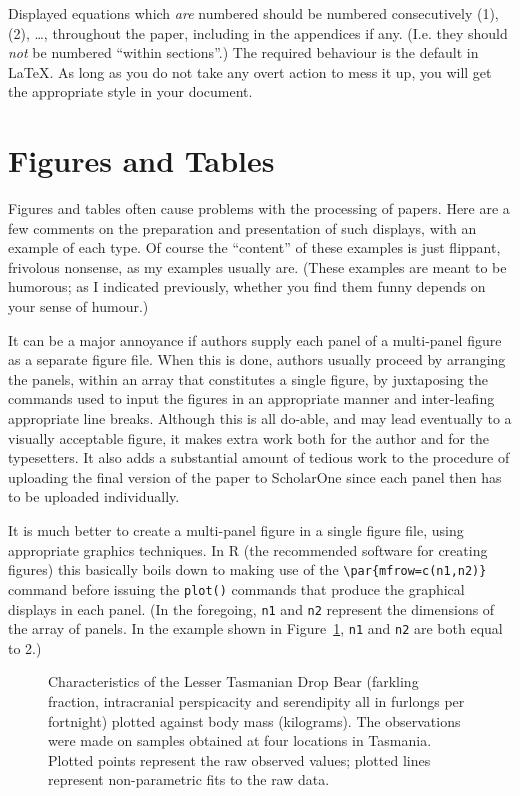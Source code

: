 \documentclass[times, doublespace]{anzsauth}
\begin{document}
\noindent
Displayed equations which \emph{are} numbered should be numbered
consecutively (1), (2), \ldots, throughout the paper, including
in the appendices if any.  (I.e. they should \emph{not} be numbered
``within sections''.)  The required behaviour is the default in
\LaTeX.  As long as you do not take any overt action to mess it up,
you will get the appropriate style in your document.

\section{Figures and Tables}
\label{sec:figAndTab}

Figures and tables often cause problems with the processing
of papers.  Here are a few comments on the preparation and
presentation of such displays, with an example of each type.
Of course the ``content'' of these examples is just flippant,
frivolous nonsense, as my examples usually are.  (These examples
are meant to be humorous; as I indicated previously, whether you
find them funny depends on your sense of humour.)

It can be a major annoyance if authors supply each panel of a
multi-panel figure as a separate figure file.  When this is done,
authors usually proceed by arranging the panels, within an array
that constitutes a single figure, by juxtaposing the commands used
to input the figures in an appropriate manner and inter-leafing
appropriate line breaks.  Although this is all do-able, and may
lead eventually to a visually acceptable figure, it makes extra
work both for the author and for the typesetters.  It also adds a
substantial amount of tedious work to the procedure of uploading
the final version of the paper to ScholarOne since each panel then
has to be uploaded individually.

It is much better to create a multi-panel figure in a single figure
file, using appropriate graphics techniques.  In \textsf{R} (the
recommended software for creating figures) this basically boils
down to making use of the \verb!\par{mfrow=c(n1,n2)}! command
before issuing the \texttt{plot()} commands that produce the
graphical displays in each panel.  (In the foregoing, \texttt{n1}
and \texttt{n2} represent the dimensions of the array of panels.
In the example shown in Figure~\ref{fig:ltdb}, \texttt{n1} and
\texttt{n2} are both equal to 2.)

\begin{figure}[htp]
\centering
{}
\caption{\label{fig:ltdb}
Characteristics of the Lesser Tasmanian Drop Bear (farkling
fraction, intracranial perspicacity and serendipity all in
furlongs per fortnight) plotted against body mass (kilograms).
The observations were made on samples obtained at four locations
in Tasmania. Plotted points represent the raw observed values;
plotted lines represent non-parametric fits to the raw data.}
\end{figure}
\end{document}
